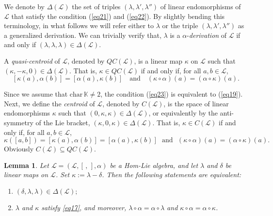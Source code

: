 \documentclass[14pt]{article}
\newtheorem{Lemma}[thm]{Lemma}
\theoremstyle{Definition}
\theoremstyle{remark}
\begin{document}
We denote by $\Delta(\mathcal{L})$ the set of triples $(\lambda, \lambda', \lambda'')$ of linear endomorphisms of $\mathcal{L}$ that satisfy the condition (\ref{eq21}) and (\ref{eq22}). By slightly bending this terminology, in what follows we will refer either to $\lambda$ or the triple $(\lambda, \lambda', \lambda'')$ as a generalized derivation. We can trivially verify that, $\lambda$ is a $\alpha$-\emph{derivation} of $\mathcal{L}$ if and only if $(\lambda, \lambda, \lambda) \in \Delta(\mathcal{L})$.  

A \emph{quasi-centroid} of $\mathcal{L}$, denoted by $QC(\mathcal{L})$, is a linear map 
$\kappa$ on $\mathcal{L}$ such that $(\kappa, -\kappa, 0) \in \Delta(\mathcal{L})$. 
That is, $\kappa \in QC(\mathcal{L})$ if and only if, for all $a, b \in \mathcal{L}$,
\begin{equation}\label{eq23}
[\kappa(a), \alpha(b)] = [\alpha(a), \kappa(b)]
\quad \text{and} \quad 
(\kappa \circ \alpha)(a) = (\alpha \circ \kappa)(a).
\end{equation}

Since we assume that $\mathrm{char}\,\mathbb{K} \neq 2$, the condition (\ref{eq23}) is equivalent to (\ref{eq19}). Next, we define the \emph{centroid} of $\mathcal{L}$, denoted by $C(\mathcal{L})$, is the space of linear endomorphisms $\kappa$ such that $(0, \kappa, \kappa) \in \Delta(\mathcal{L})$, or equivalently by the anti-symmetry of the Lie bracket, $(\kappa, 0, \kappa) \in \Delta(\mathcal{L})$.  
That is, $\kappa \in C(\mathcal{L})$ if and only if, for all $a, b \in \mathcal{L}$,
\begin{equation}
\kappa([a, b]) = [\kappa(a),\alpha(b)] = [\alpha(a), \kappa(b)]~~~\text{and}~~~(\kappa\circ\alpha)(a)=(\alpha\circ\kappa)(a).
\end{equation}
Obviously $C(\mathcal{L}) \subseteq QC(\mathcal{L})$.

\begin{Lemma}\label{Lemma6.6}
Let $\mathcal{L} = (\mathcal{L}, [\, , \,], \alpha)$ be a Hom-Lie algebra, and let $\lambda$ and $\delta$ be linear maps on $\mathcal{L}$.  
Set $\kappa := \lambda - \delta$. Then the following statements are equivalent:
\begin{enumerate}
\item[(i)] $(\delta, \lambda, \lambda) \in \Delta(\mathcal{L});$
\item[(ii)] $\lambda$ and $\kappa$ satisfy \eqref{eq17}, and moreover, $\lambda \circ \alpha = \alpha \circ \lambda$ and $\kappa \circ \alpha = \alpha \circ \kappa$.
\end{enumerate}
\end{Lemma}
\end{document}
